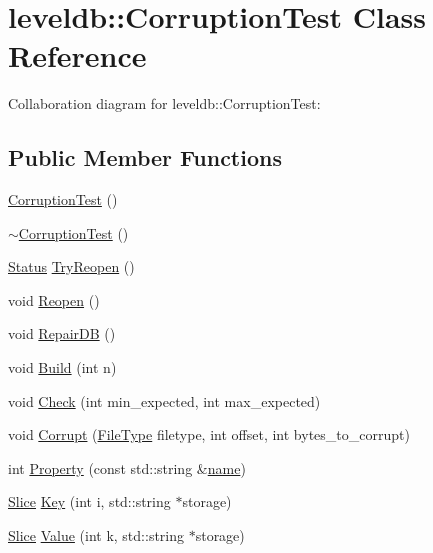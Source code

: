\hypertarget{classleveldb_1_1_corruption_test}{}\section{leveldb\+:\+:Corruption\+Test Class Reference}
\label{classleveldb_1_1_corruption_test}


Collaboration diagram for leveldb\+:\+:Corruption\+Test\+:
\subsection*{Public Member Functions}
\begin{DoxyCompactItemize}
\item 
\hyperlink{classleveldb_1_1_corruption_test_a9940767db260b1e4e60b8bcedc50217c}{Corruption\+Test} ()
\item 
\hyperlink{classleveldb_1_1_corruption_test_a4086f02f771d78d4ce242c14b0e392d9}{$\sim$\+Corruption\+Test} ()
\item 
\hyperlink{classleveldb_1_1_status}{Status} \hyperlink{classleveldb_1_1_corruption_test_aaba7c05f06400ef45d1af5cb95f66a57}{Try\+Reopen} ()
\item 
void \hyperlink{classleveldb_1_1_corruption_test_aa2051faee6b6542d35ebdcf99918a713}{Reopen} ()
\item 
void \hyperlink{classleveldb_1_1_corruption_test_aff36b45496c39a006a14df201ef7d57b}{Repair\+D\+B} ()
\item 
void \hyperlink{classleveldb_1_1_corruption_test_a54d2114311c61356e879b5ccfc3cda18}{Build} (int n)
\item 
void \hyperlink{classleveldb_1_1_corruption_test_aa03dcde1d0771ebbcf7d6ac8bda9c725}{Check} (int min\+\_\+expected, int max\+\_\+expected)
\item 
void \hyperlink{classleveldb_1_1_corruption_test_a22060ac0a3697640cdcf36973339b646}{Corrupt} (\hyperlink{namespaceleveldb_ab8e559ac5cadcb2b5dd531c60df944f1}{File\+Type} filetype, int offset, int bytes\+\_\+to\+\_\+corrupt)
\item 
int \hyperlink{classleveldb_1_1_corruption_test_aab1ed767d1cdac7e95a32ccf6defc709}{Property} (const std\+::string \&\hyperlink{testharness_8cc_a8f8f80d37794cde9472343e4487ba3eb}{name})
\item 
\hyperlink{classleveldb_1_1_slice}{Slice} \hyperlink{classleveldb_1_1_corruption_test_a157c0095fca3c0a2ccaf3b8647705469}{Key} (int i, std\+::string $\ast$storage)
\item 
\hyperlink{classleveldb_1_1_slice}{Slice} \hyperlink{classleveldb_1_1_corruption_test_a0afb6030faf43287b86e027a13eac152}{Value} (int k, std\+::string $\ast$storage)
\end{DoxyCompactItemize}
